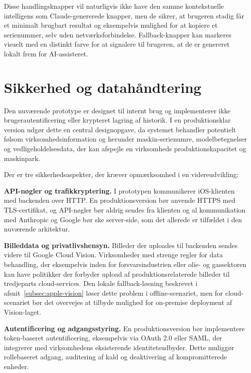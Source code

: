 Disse handlingsknapper vil naturligvis ikke have den samme kontekstuelle intelligens som Claude-genererede knapper, men de sikrer, at brugeren stadig får et minimalt brugbart resultat og eksempelvis mulighed for at kopiere et serienummer, selv uden netværksforbindelse. Fallback-knapper kan markeres visuelt med en distinkt farve for at signalere til brugeren, at de er genereret lokalt frem for AI-assisteret.

\section{Sikkerhed og datahåndtering}
\label{sec:sikkerhed}

Den nuværende prototype er designet til internt brug og implementerer ikke brugerautentificering eller krypteret lagring af historik. I en produktionsklar version udgør dette en central designopgave, da systemet behandler potentielt følsom virksomhedsinformation og herunder maskin-serienumre, modelbetegnelser og vedligeholdelsesdata, der kan afspejle en virksomheds produktionskapacitet og maskinpark.

Der er tre sikkerhedsaspekter, der kræver opmærksomhed i en videreudvikling:

\textbf{API-nøgler og trafikkryptering.} I prototypen kommunikerer iOS-klienten med backenden over HTTP. En produktionsversion bør anvende HTTPS med TLS-certifikat, og API-nøgler bør aldrig sendes fra klienten og al kommunikation med Anthropic og Google bør ske server-side, som det allerede er tilfældet i den nuværende arkitektur.

\textbf{Billeddata og privatlivshensyn.} Billeder der uploades til backenden sendes videre til Google Cloud Vision. Virksomheder med strenge regler for data behandling, der eksempelvis inden for forsvarsindustrien eller olie- og gassektoren kan have politikker der forbyder upload af produktionsrelaterede billeder til tredjeparts cloud-services. Den lokale fallback-løsning beskrevet i afsnit~\ref{subsec:apple-vision} løser dette problem i offline-scenariet, men for cloud-scenariet bør det overvejes at tilbyde mulighed for on-premise deployment af Vision-laget.

\textbf{Autentificering og adgangsstyring.} En produktionsversion bør implementere token-baseret autentificering, eksempelvis via OAuth 2.0 eller SAML, der integrerer med virksomhedens eksisterende identitetsudbyder. Dette muliggør rollebaseret adgang, auditering af kald og deaktivering af kompromitterede enheder.

